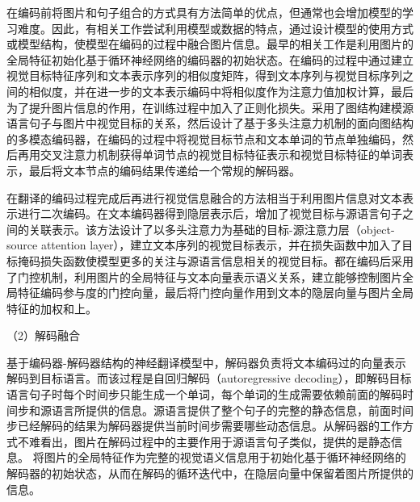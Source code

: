 在编码前将图片和句子组合的方式具有方法简单的优点，但通常也会增加模型的学习难度。因此，有相关工作尝试利用模型或数据的特点，通过设计模型的使用方式或模型结构，使模型在编码的过程中融合图片信息。最早的相关工作是利用图片的全局特征初始化基于循环神经网络的编码器的初始状态。在编码的过程中通过建立视觉目标特征序列和文本表示序列的相似度矩阵，得到文本序列与视觉目标序列之间的相似度，并在进一步的文本表示编码中将相似度作为注意力值加权计算，最后为了提升图片信息的作用，在训练过程中加入了正则化损失。采用了图结构建模源语言句子与图片中视觉目标的关系，然后设计了基于多头注意力机制的面向图结构的多模态编码器，在编码的过程中将视觉目标节点和文本单词的节点单独编码，然后再用交叉注意力机制获得单词节点的视觉目标特征表示和视觉目标特征的单词表示，最后将文本节点的编码结果传递给一个常规的解码器。

在翻译的编码过程完成后再进行视觉信息融合的方法相当于利用图片信息对文本表示进行二次编码。在文本编码器得到隐层表示后，增加了视觉目标与源语言句子之间的关联表示。该方法设计了以多头注意力为基础的目标-源注意力层（object-source attention layer），建立文本序列的视觉目标表示，并在损失函数中加入了目标掩码损失函数使模型更多的关注与源语言信息相关的视觉目标。都在编码后采用了门控机制，利用图片的全局特征与文本向量表示语义关系，建立能够控制图片全局特征编码参与度的门控向量，最后将门控向量作用到文本的隐层向量与图片全局特征的加权和上。

{\sffamily （2）解码融合}

基于编码器-解码器结构的神经翻译模型中，解码器负责将文本编码过的向量表示解码到目标语言。而该过程是自回归解码（autoregressive decoding），即解码目标语言句子时每个时间步只能生成一个单词，每个单词的生成需要依赖前面的解码时间步和源语言所提供的信息。源语言提供了整个句子的完整的静态信息，前面时间步已经解码的结果为解码器提供当前时间步需要哪些动态信息。从解码器的工作方式不难看出，图片在解码过程中的主要作用于源语言句子类似，提供的是静态信息。
将图片的全局特征作为完整的视觉语义信息用于初始化基于循环神经网络的解码器的初始状态，从而在解码的循环迭代中，在隐层向量中保留着图片所提供的信息。

